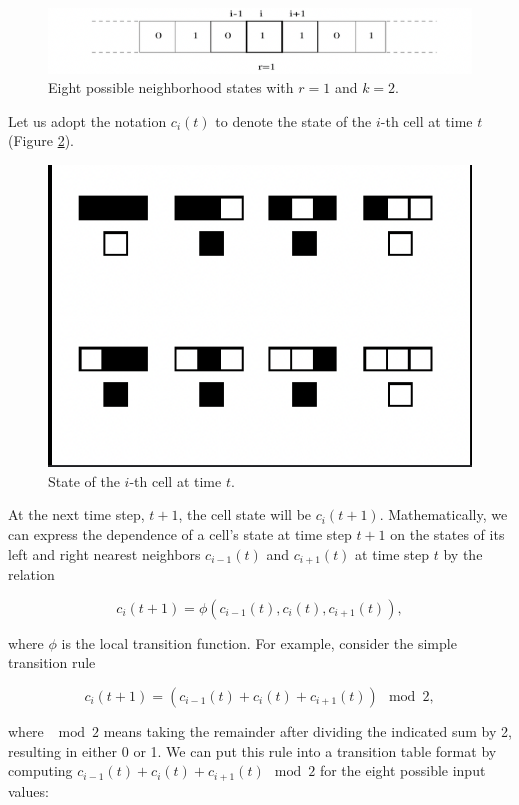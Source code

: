 \documentclass[9pt,a4paper,twoside]{tau-class/tau}
\begin{document}
        \begin{figure}[H]
            \centering
            \includegraphics[width=0.9\columnwidth]{figures/transition_rule.png}
            \caption{Eight possible neighborhood states with \( r = 1 \) and \( k = 2 \).}
            \label{fig:neighborhood_states}
        \end{figure}
    Let us adopt the notation \( c_i(t) \) to denote the state of the \( i \)-th cell at time \( t \) (Figure \ref{fig:cell_states}).
    
    
    \begin{figure}[H]
        \centering
        \includegraphics[width=0.45\columnwidth]{figures/rule_graphic.png}
         \caption{State of the \( i \)-th cell at time \( t \).} 
        \label{fig:cell_states}
    \end{figure}


    At the next time step, \( t + 1 \), the cell state will be \( c_i(t + 1) \). Mathematically, we can express the dependence of a cell’s state at time step \( t + 1 \) on the states of its left and right nearest neighbors \( c_{i-1}(t) \) and \( c_{i+1}(t) \) at time step \( t \) by the relation

    \begin{equation}
        c_i(t + 1) = \phi \left( c_{i-1}(t), c_i(t), c_{i+1}(t) \right),
    \end{equation}

    where \( \phi \) is the local transition function. For example, consider the simple transition rule

    \begin{equation}
        c_i(t + 1) = \left( c_{i-1}(t) + c_i(t) + c_{i+1}(t) \right) \mod 2,
        \label{eq:transition_rule}
    \end{equation}

    where $\mod 2$ means taking the remainder after dividing the indicated sum by 2, resulting in either 0 or 1. We can put this rule into a transition table format by computing \( c_{i-1}(t) + c_i(t) + c_{i+1}(t) \mod 2 \) for the eight possible input values:
\end{document}
